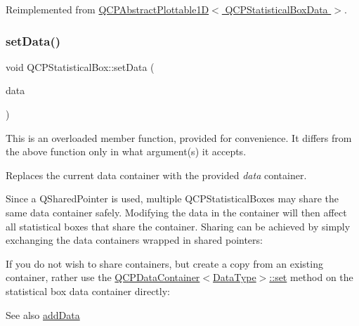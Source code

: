 Reimplemented from \hyperlink{class_q_c_p_abstract_plottable1_d_ac385c38a79e419ed3600c2ee398fd216}{Q\+C\+P\+Abstract\+Plottable1\+D$<$ Q\+C\+P\+Statistical\+Box\+Data $>$}.

\mbox{\label{class_q_c_p_statistical_box_a08a6da55822bad825ee25a8069b9b52f}} 
\subsubsection{\texorpdfstring{set\+Data()}{setData()}\hspace{0.1cm}{\footnotesize\ttfamily [1/2]}}
{\footnotesize\ttfamily void Q\+C\+P\+Statistical\+Box\+::set\+Data (\begin{DoxyParamCaption}\item[{Q\+Shared\+Pointer$<$ \hyperlink{class_q_c_p_data_container}{Q\+C\+P\+Statistical\+Box\+Data\+Container} $>$}]{data }\end{DoxyParamCaption})}

This is an overloaded member function, provided for convenience. It differs from the above function only in what argument(s) it accepts.

Replaces the current data container with the provided {\itshape data} container.

Since a Q\+Shared\+Pointer is used, multiple Q\+C\+P\+Statistical\+Boxes may share the same data container safely. Modifying the data in the container will then affect all statistical boxes that share the container. Sharing can be achieved by simply exchanging the data containers wrapped in shared pointers\+: 
\begin{DoxyCodeInclude}
\end{DoxyCodeInclude}
 If you do not wish to share containers, but create a copy from an existing container, rather use the \hyperlink{class_q_c_p_data_container_ae7042bd534fc3ce7befa2ce3f790b5bf}{Q\+C\+P\+Data\+Container$<$\+Data\+Type$>$\+::set} method on the statistical box data container directly\+: 
\begin{DoxyCodeInclude}
\end{DoxyCodeInclude}
 \begin{DoxySeeAlso}{See also}
\hyperlink{class_q_c_p_statistical_box_a9a8739c5b8291db8fd839e892fc8f478}{add\+Data} 
\end{DoxySeeAlso}
\mbox{\label{class_q_c_p_statistical_box_a4ae198e66243d8cc57ad8893c37bf9d4}} 
